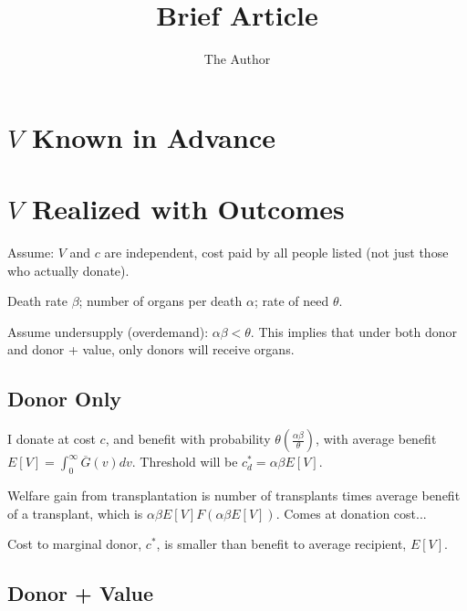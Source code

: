 \documentclass[11pt, oneside]{article}   	%
\title{Brief Article}
\author{The Author}
\begin{document}
\maketitle



\section{$V$ Known in Advance}



\section{$V$ Realized with Outcomes}

Assume: $V$ and $c$ are independent, cost paid by all people listed (not just those who actually donate).

Death rate $\beta$; number of organs per death $\alpha$; rate of need $\theta$.

Assume undersupply (overdemand): $\alpha \beta < \theta$. This implies that under both donor and donor + value, only donors will receive organs.


\subsection{Donor Only}

I donate at cost $c$, and benefit with probability $\theta \left( \frac{\alpha \beta}{\theta} \right)$, with average benefit $E[V] = \int_0^\infty \overline{G}(v) dv$. Threshold will be $c_{d}^* = \alpha \beta E[V]$. 

Welfare gain from transplantation is number of transplants times average benefit of a transplant, which is $\alpha \beta E[V] F(\alpha \beta E[V])$. {\color{red} Comes at donation cost...} %

Cost to marginal donor, $c^*$, is smaller than benefit to average recipient, $E[V]$.


\subsection{Donor + Value}
\end{document}
